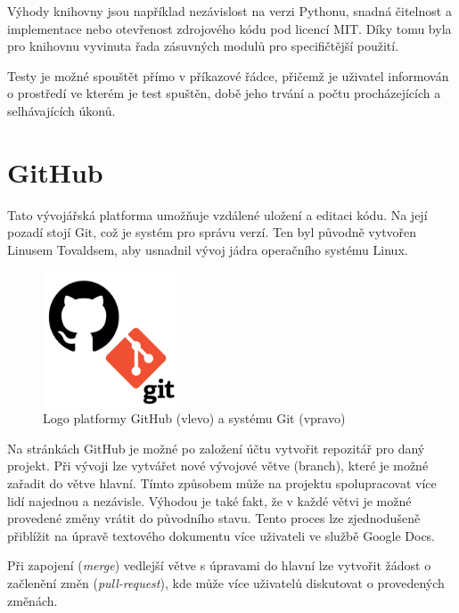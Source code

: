 \documentclass[a4paper,oneside,12pt]{book}
\begin{document}
\hspace{10mm}Výhody knihovny jsou například nezávislost na verzi Pythonu, snadná čitelnost a implementace nebo otevřenost zdrojového kódu pod licencí MIT. Díky tomu byla pro knihovnu vyvinuta řada zásuvných modulů pro specifičtější použití. \cite{Okken2017}

\hspace{10mm}Testy je možné spouštět přímo v příkazové řádce, přičemž je uživatel informován o prostředí ve kterém je test spuštěn, době jeho trvání a počtu procházejících a selhávajících úkonů.   

\section{GitHub} \label{github}
Tato vývojářská platforma umožňuje vzdálené uložení a editaci kódu. Na její pozadí stojí Git, což je systém pro správu verzí. Ten byl původně vytvořen Linusem Tovaldsem, aby usnadnil vývoj jádra operačního systému Linux. \cite{Guthals2023}

\begin{figure}[ht] \label{obr10}
\centering
\includegraphics[height=4cm]{pictures/git.png}
\caption{Logo platformy GitHub (vlevo) a systému Git (vpravo) \cite{Guthals2023}}
\label{fig:git}
\end{figure}

\hspace{10mm}Na stránkách GitHub je možné po založení účtu vytvořit repozitář pro daný projekt. Při vývoji lze vytvářet nové vývojové větve (branch), které je možné zařadit do větve hlavní. Tímto způsobem může na projektu spolupracovat více lidí najednou a nezávisle. Výhodou je také fakt, že v každé větvi je možné provedené změny vrátit do původního stavu. Tento proces lze zjednodušeně přiblížit na úpravě textového dokumentu více uživateli ve službě Google Docs. \cite{Guthals2023}

\hspace{10mm}Při zapojení (\textit{merge}) vedlejší větve s úpravami do hlavní lze vytvořit žádost o začlenění změn (\textit{pull-request}), kde může více uživatelů diskutovat o provedených změnách. \cite{Guthals2023}
\end{document}

